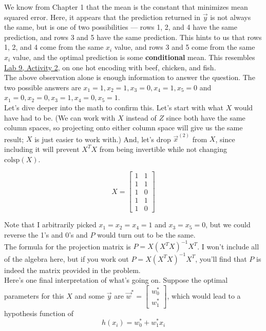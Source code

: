 \documentclass[11pt]{article}
\begin{document}
\begin{prob}
\begin{subprob}
\begin{solution}
We know from Chapter 1 that the mean is the constant that minimizes mean squared error. Here, it appears that the prediction returned in $\vec y$ is not always the same, but is one of two possibilities --- rows 1, 2, and 4 have the same prediction, and rows 3 and 5 have the same prediction. This hints to us that rows 1, 2, and 4 come from the same $x_i$ value, and rows 3 and 5 come from the same $x_i$ value, and the optimal prediction is some \textbf{conditional} mean. This resembles \href{https://eecs245.org/resources/labs/lab09/lab09-solutions.pdf\#page=3}{Lab 9, Activity 2}, on one hot encoding with beef, chicken, and fish. \\

The above observation alone is enough information to answer the question. The two possible answers are $\boxed{x_1 = 1, x_2 = 1, x_3 = 0, x_4 = 1, x_5 = 0}$ and $\boxed{x_1 = 0, x_2 = 0, x_3 = 1, x_4 = 0, x_5 = 1}$. \\

Let's dive deeper into the math to confirm this. Let's start with what $X$ would have had to be. (We can work with $X$ instead of $Z$ since both have the same column spaces, so projecting onto either column space will give us the same result; $X$ is just easier to work with.) And, let's drop $\vec x^{(2)}$ from $X$, since including it will prevent $X^TX$ from being invertible while not changing $\text{colsp}(X)$.

$$X = \begin{bmatrix} 1 & 1 \\ 1 & 1 \\ 1 & 0 \\ 1 & 1 \\ 1 & 0 \end{bmatrix}$$

Note that I arbitrarily picked $x_1 = x_2 = x_4 = 1$ and $x_3 = x_5 = 0$, but we could reverse the 1's and 0's and $P$ would turn out to be the same. \\

The formula for the projection matrix is $P = X (X^TX)^{-1}X^T$. I won't include all of the algebra here, but if you work out $P = X (X^TX)^{-1}X^T$, you'll find that $P$ is indeed the matrix provided in the problem. \\

Here's one final interpretation of what's going on. Suppose the optimal parameters for this $X$ and some $\vec y$ are $\vec w^* = \begin{bmatrix} w_0^* \\ w_1^* \end{bmatrix}$, which would lead to a hypothesis function of
$$h(x_i) = w_0^* + w_1^* x_i$$


\end{solution}
\end{subprob}
\end{prob}
\end{document}
